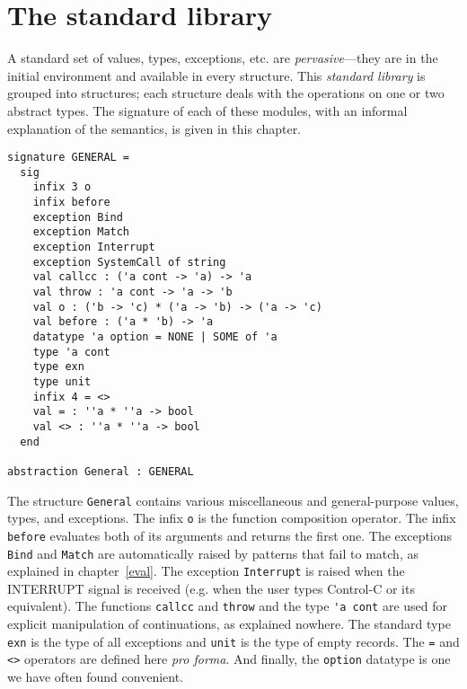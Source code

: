 \chapter{The standard library}
\label{library}

A standard set of values, types, exceptions, etc. are {\em
pervasive}---they are in the initial environment and available in
every structure.  This {\em standard library} is grouped into
structures; each structure deals with the operations on one or two
abstract types.  The signature of each of these modules, with an
informal explanation of the semantics, is given in this chapter.

\begin{verbatim}
signature GENERAL =
  sig
    infix 3 o
    infix before
    exception Bind
    exception Match
    exception Interrupt
    exception SystemCall of string
    val callcc : ('a cont -> 'a) -> 'a
    val throw : 'a cont -> 'a -> 'b
    val o : ('b -> 'c) * ('a -> 'b) -> ('a -> 'c)
    val before : ('a * 'b) -> 'a
    datatype 'a option = NONE | SOME of 'a
    type 'a cont
    type exn
    type unit
    infix 4 = <>
    val = : ''a * ''a -> bool
    val <> : ''a * ''a -> bool
  end

abstraction General : GENERAL
\end{verbatim}
The structure \verb"General" contains various miscellaneous and
general-purpose values, types, and exceptions.  The infix \verb"o"
is the function composition operator.  The infix \verb"before" evaluates
both of its arguments and returns the first one.  The exceptions
\verb"Bind" and \verb"Match" are automatically raised by patterns
that fail to match, as explained in chapter~\ref{eval}.  The exception
\verb"Interrupt" is raised when the INTERRUPT signal is received
(e.g. when the user types Control-C or its equivalent).
The functions \verb"callcc" and \verb"throw" and the type \verb"'a cont"
are used for explicit manipulation of continuations, as explained nowhere.
The standard type \verb"exn" 
is the type of all exceptions and \verb"unit" is the type of empty
records.  The \verb"=" and \verb"<>" operators are defined here {\it pro
forma}.  And finally, the \verb"option" datatype is one we have often found
convenient.

